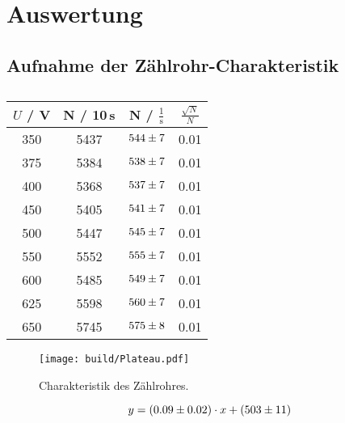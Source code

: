 \section{Auswertung}
\label{sec:Auswertung}

\subsection{Aufnahme der Zählrohr-Charakteristik}

\begin{table}[H]
  \centering
  \begin{tabular}{c|c|c|c}
    \hline
    $U$ / V & N / 10\,s & N / $\frac{1}{\text{s}}$ & $\frac{\sqrt{N}}{N}$ \\
    \hline
    350 & 5437 & $\num{544 +- 7}$ & 0.01 \\
    375 & 5384 & $\num{538 +- 7}$ & 0.01 \\
    400 & 5368 & $\num{537 +- 7}$ & 0.01 \\
    450 & 5405 & $\num{541 +- 7}$ & 0.01 \\
    500 & 5447 & $\num{545 +- 7}$ & 0.01 \\
    550 & 5552 & $\num{555 +- 7}$ & 0.01 \\
    600 & 5485 & $\num{549 +- 7}$ & 0.01 \\
    625 & 5598 & $\num{560 +- 7}$ & 0.01 \\
    650 & 5745 & $\num{575 +- 8}$ & 0.01 \\
  \end{tabular}
  \caption{}
  \label{tab:}
\end{table}

\begin{figure}[H]
  \centering
  \texttt{[image: build/Plateau.pdf]}
  \caption{Charakteristik des Zählrohres.}
  \label{fig:Plateau}
\end{figure}

\begin{equation*}
  y = (\num{0.09 +- 0.02}) \cdot x + (\num{503 +- 11})
\end{equation*}
